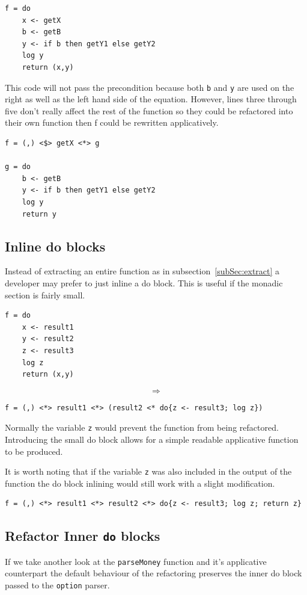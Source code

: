 \begin{lstlisting}[frame=tblr]
f = do
	x <- getX
	b <- getB
	y <- if b then getY1 else getY2
	log y
	return (x,y)	
\end{lstlisting}

This code will not pass the precondition because both \texttt{b} and \texttt{y} are used on the right as well as the left hand side of the equation. However, lines three through five don't really affect the rest of the function so they could be refactored into their own function then f could be rewritten applicatively.

\begin{lstlisting}[frame=tblr]
f = (,) <$> getX <*> g

g = do
	b <- getB
	y <- if b then getY1 else getY2
	log y
	return y
\end{lstlisting}

\subsection{Inline do blocks}
Instead of extracting an entire function as in subsection~\ref{subSec:extract} a developer may prefer to just inline a do block. This is useful if the monadic section is fairly small.

\begin{lstlisting}[frame=tblr]
f = do
	x <- result1
	y <- result2
	z <- result3
	log z
	return (x,y)
\end{lstlisting}
\larger[5]
\[\Rightarrow\]
\normalsize
\begin{lstlisting}[frame=tblr]
f = (,) <*> result1 <*> (result2 <* do{z <- result3; log z})
\end{lstlisting}

Normally the variable \texttt{z} would prevent the function from being refactored. Introducing the small do block allows for a simple readable applicative function to be produced. 

It is worth noting that if the variable \texttt{z} was also included in the output of the function the do block inlining would still work with a slight modification.

\begin{lstlisting}[frame=tblr]
f = (,) <*> result1 <*> result2 <*> do{z <- result3; log z; return z}
\end{lstlisting}

\subsection{Refactor Inner \texttt{do} blocks}
If we take another look at the \texttt{parseMoney} function and it's applicative counterpart the default behaviour of the refactoring preserves the inner do block passed to the \texttt{option} parser.

